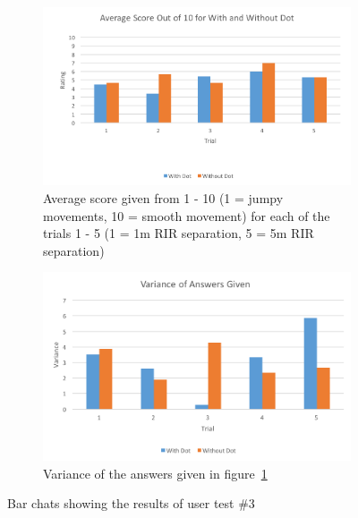 \documentclass[../../main.tex]{subfiles}
\begin{document}
				\begin{figure}[H]
					\begin{subfigure}{1\textwidth}
						\centerline{\includegraphics[scale = 0.7]{Sections/userTesting/images/test3/Q3Score.png}}
						\caption{Average score given from 1 - 10 (1 = jumpy movements, 10 = smooth movement) for each of the trials 1 - 5 (1 = 1m \ac{RIR} separation, 5 = 5m \ac{RIR} separation)}
						\label{score}
					\end{subfigure}
					
					\begin{subfigure}{1\textwidth}
						\centerline{\includegraphics[scale = 0.7]{Sections/userTesting/images/test3/Q3Variance.png}}
						\caption{Variance of the answers given in figure~\ref{score}}
						\label{variance}
					\end{subfigure}
					\caption{Bar chats showing the results of user test \#3}
					\label{test1Results}
				\end{figure}
\end{document}
